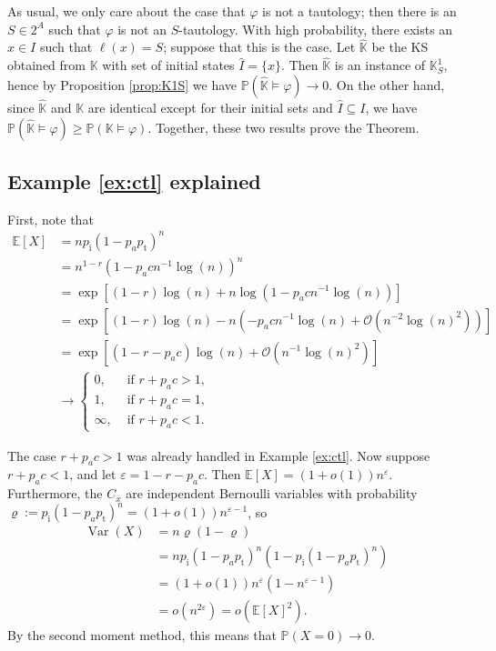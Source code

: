 \documentclass[runngingheads]{llncs}
\newcommand\recht\operatorname
\begin{document}
As usual, we only care about the case that $\varphi$ is not a tautology; then there is an $S \in 2^A$ such that $\varphi$ is not an $S$-tautology. With high probability, there exists an $x \in I$ such that $\ell(x) = S$; suppose that this is the case. Let $\hat{\mathbb{K}}$ be the KS obtained from $\mathbb{K}$ with set of initial states $\hat{I} = \{x\}$. Then $\hat{\mathbb{K}}$ is an instance of $\mathbb{K}^1_S$, hence by Proposition \ref{prop:K1S} we have $\mathbb{P}(\hat{\mathbb{K}} \models \varphi) \rightarrow 0$. On the other hand, since $\hat{\mathbb{K}}$ and $\mathbb{K}$ are identical except for their initial sets and $\hat{I} \subseteq I$, we have $\mathbb{P}(\hat{\mathbb{K}} \models \varphi) \geq \mathbb{P}(\mathbb{K} \models \varphi)$. Together, these two results prove the Theorem.

\subsection{Example \ref{ex:ctl} explained} \label{app:ex}

First, note that
\begin{align*}
\mathbb{E}[X] &= np_{\recht{i}}(1-p_ap_{\recht{t}})^n\\
&= n^{1-r}\left(1-p_acn^{-1}\log(n)\right)^n \\
&= \operatorname{exp}\left[(1-r)\log(n) + n\log(1-p_acn^{-1}\log(n))\right]\\
&= \exp\left[(1-r)\log(n)-n\left(-p_acn^{-1}\log(n) +\mathcal{O}(n^{-2}\log(n)^2)\right)\right]\\
&= \exp\left[(1-r-p_ac)\log(n)+\mathcal{O}(n^{-1}\log(n)^2)\right]\\
&\rightarrow \begin{cases}
    0, & \textrm{ if } r+p_ac > 1,\\
    1, & \textrm{ if } r+p_ac = 1,\\
    \infty, & \textrm{ if } r+p_ac< 1.
\end{cases}
\end{align*}

The case $r+p_ac > 1$ was already handled in Example \ref{ex:ctl}. Now suppose $r+p_ac < 1$, and let $\varepsilon = 1-r-p_ac$. Then $\mathbb{E}[X] = (1+o(1))n^{\varepsilon}$. Furthermore, the $C_x$ are independent Bernoulli variables with probability $\varrho := p_{\recht{i}}(1-p_ap_{\recht{t}})^n = (1+o(1))n^{\varepsilon-1}$, so
\begin{align*}
\operatorname{Var}(X) &= n\varrho(1-\varrho)\\
&= np_{\recht{i}}(1-p_ap_{\recht{t}})^n(1-p_{\recht{i}}(1-p_ap_{\recht{t}})^n)\\
&= (1+o(1))n^{\varepsilon}(1-n^{\varepsilon-1})\\
&= o(n^{2\varepsilon}) = o(\mathbb{E}[X]^2).
\end{align*}
By the second moment method, this means that $\mathbb{P}(X = 0) \rightarrow 0$.
\end{document}
